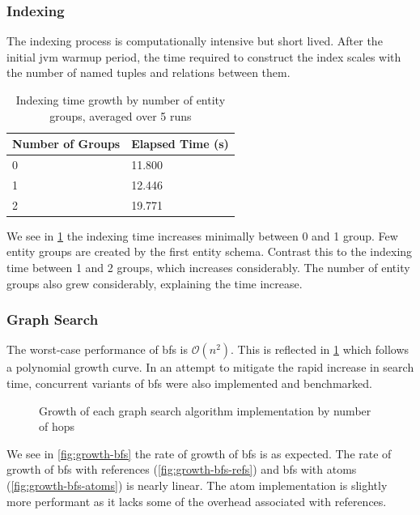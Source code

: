 			\subsubsection{Indexing}
				The indexing process is computationally intensive but short lived.  After the initial \gls{jvm} warmup period, the time required to construct the index scales with the number of named tuples and relations between them.
				
				\begin{table}
					\centering
					\begin{tabular}{ll}
						\toprule
						Number of Groups & Elapsed Time (s) \\
						\midrule
						0 & 11.800 \\
						1 & 12.446 \\
						2 & 19.771 \\
						\bottomrule
					\end{tabular}
					
					\caption{Indexing time growth by number of entity groups, averaged over 5 runs}
					\label{tbl:index-growth-entity-groups}
				\end{table}
				
				We see in \cref{tbl:index-growth-entity-groups} the indexing time increases minimally between 0 and 1 group.  Few entity groups are created by the first entity schema.  Contrast this to the indexing time between 1 and 2 groups, which increases considerably.  The number of entity groups also grew considerably, explaining the time increase.
			
			\subsubsection{Graph Search}
				The worst-case performance of \gls{bfs} is \(\mathcal{O}(n^2)\).  This is reflected in \cref{fig:growth} which follows a polynomial growth curve.  In an attempt to mitigate the rapid increase in search time, concurrent variants of \gls{bfs} were also implemented and benchmarked.
				
				\begin{figure}
					\centering
					
					\caption{Growth of each graph search algorithm implementation by number of hops}
					\label{fig:growth}
				\end{figure}
				
				We see in \cref{fig:growth-bfs} the rate of growth of \gls{bfs} is as expected.  The rate of growth of \gls{bfs} with references (\cref{fig:growth-bfs-refs}) and \gls{bfs} with atoms (\cref{fig:growth-bfs-atoms}) is nearly linear.  The atom implementation is slightly more performant as it lacks some of the overhead associated with references.
				

